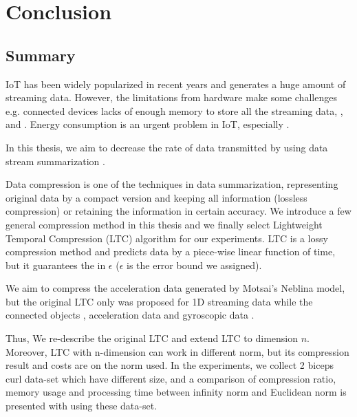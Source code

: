 \chapter{Conclusion}



\section{Summary}


IoT has been widely popularized in recent years and generates a huge amount of
streaming data. However, the limitations from hardware make some challenges e.g. 
connected devices lacks of enough memory to store all the streaming data,
, and . Energy consumption is an urgent
problem in IoT, especially .

In this thesis, we aim to decrease the rate of data transmitted by using data
stream summarization . 

Data compression is one of the techniques in data summarization, representing
original data by a compact version and keeping all information (lossless
compression) or retaining the information in certain accuracy. We introduce a
few general compression method in this thesis and we finally select Lightweight
Temporal Compression (LTC) algorithm for our experiments. LTC is a lossy
compression method and predicts data by a piece-wise linear function of time,
but it guarantees the  in $\epsilon$ ($\epsilon$ is the error
bound we assigned). 

We aim to compress the acceleration data generated by Motsai's Neblina model,
but the original LTC only was proposed for 1D streaming data while the connected
objects ,  acceleration data and
gyroscopic data .

Thus, We  re-describe the original LTC  and extend LTC to dimension $n$. Moreover,
LTC with n-dimension can work in different norm, but its compression result and
costs are  on the norm used. In the experiments, we collect 2 biceps
curl data-set which have different size, and a comparison of compression ratio,
memory usage and processing time between infinity norm and Euclidean norm is
presented with using these data-set.  

